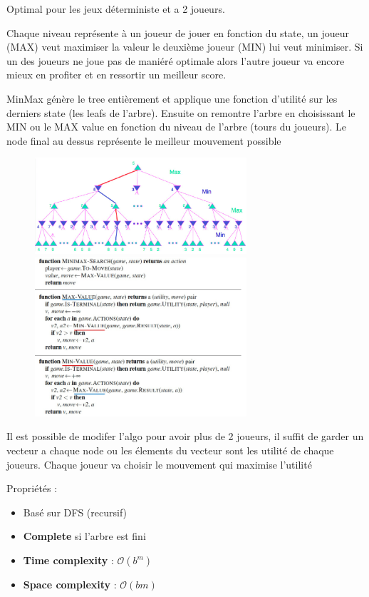 		Optimal pour les jeux déterministe et a 2 joueurs. 
		
		Chaque niveau représente à un joueur de jouer en fonction du state, un joueur (MAX) veut maximiser la valeur le deuxième joueur (MIN) lui veut minimiser. Si un des joueurs ne joue pas de maniéré optimale alors l'autre joueur va encore mieux en profiter et en ressortir un meilleur score.
		
		MinMax génère le tree entièrement et applique une fonction d'utilité sur les derniers state (les leafs de l'arbre). Ensuite on remontre l'arbre en choisissant le MIN ou le MAX value en fonction du niveau de l'arbre (tours du joueurs). Le node final au dessus représente le meilleur mouvement possible

		\begin{figure}[htp]
			\centering
			\includegraphics[width=0.7\textwidth]{img/exMinMax.png}
			\includegraphics[width=0.7\textwidth]{img/algoMinMax.png}
		\end{figure}

		
		Il est possible de modifer l'algo pour avoir plus de 2 joueurs, il suffit de garder un vecteur a chaque node ou les élements du vecteur sont les utilité de chaque joueurs. Chaque joueur va choisir le mouvement qui maximise l'utilité
		
		Propriétés :
		\begin{itemize}
			\item Basé sur DFS (recursif)
			\item \textbf{Complete} si l'arbre est fini
			\item \textbf{Time complexity} : $\mathcal{O}(b^m)$
			\item \textbf{Space complexity} : $\mathcal{O}(bm)$
		\end{itemize}
		
